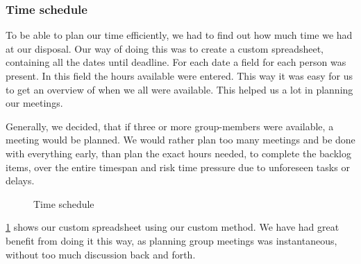 \subsubsection{Time schedule}
To be able to plan our time efficiently, we had to find out how much time we had at our disposal. Our way of doing this was to create a custom spreadsheet, containing all the dates until deadline. For each date a field for each person was present. In this field the hours available were entered. This way it was easy for us to get an overview of when we all were available. This helped us a lot in planning our meetings.

Generally, we decided, that if three or more group-members were available, a meeting would be planned. We would rather plan too many meetings and be done with everything early, than plan the exact hours needed, to complete the backlog items, over the entire timespan and risk time pressure due to unforeseen tasks or delays.

\begin{figure}[H]
  \caption{Time schedule}
  \label{time schedule}
\end{figure}

\cref{time schedule} shows our custom spreadsheet using our custom method. We have had great benefit from doing it this way, as planning group meetings was instantaneous, without too much discussion back and forth.